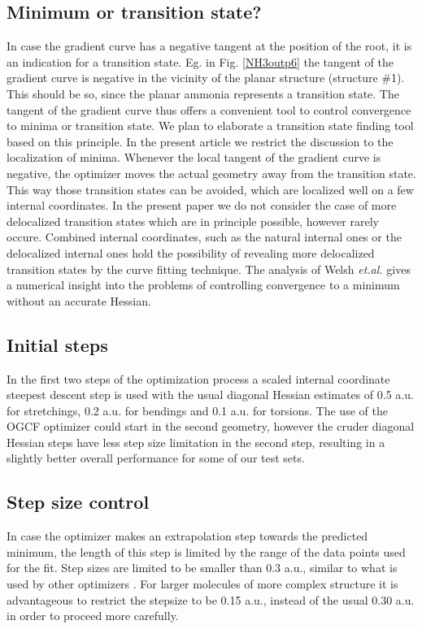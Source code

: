 \documentclass[prl,aps,twocolumn,showpacs,twocolumngrid,superbib]{revtex4}
\begin{document}
\subsection{Minimum or transition state?}
In case the gradient curve has a negative tangent at the position
of the root, it is an indication for a transition state. 
Eg. in Fig. \ref{NH3outp6} the tangent of the gradient curve 
is negative in the vicinity of the planar
structure (structure \#1). This should be so, since the planar
ammonia represents a transition state. The tangent of the gradient 
curve thus offers a
convenient tool to control convergence to minima or transition state.
We plan to elaborate a transition state finding tool based on this 
principle. In the present article we restrict the discussion
to the localization of minima. Whenever the local tangent  
of the gradient curve
is negative, the optimizer moves the actual geometry away from 
the transition state. This way those transition states 
can be avoided, which are localized well on a few internal coordinates. 
In the present paper we do not consider the case of more 
delocalized transition states which are in principle possible,
however rarely occure. Combined internal coordinates, such
as the natural internal ones \cite{Pulay_natural_internals} or the
delocalized internal ones \cite{Baker_deloc_1} hold the possibility
of revealing more delocalized transition states by the
curve fitting technique. The analysis of Welsh {\it et.al.} 
gives a numerical insight into the problems of controlling
convergence to a minimum without an accurate Hessian.

\subsection{Initial steps}
In the first two steps of the optimization
process a scaled internal coordinate steepest descent step is used
with the usual diagonal Hessian estimates of
0.5 a.u. for stretchings, 0.2 a.u. for bendings and 0.1 a.u.
for torsions. The use of the OGCF optimizer could start in the
second geometry, however the cruder diagonal Hessian steps have less
step size limitation in the second step, resulting in a slightly
better overall performance for some of our test sets.

\subsection{Step size control}
In case the optimizer makes an extrapolation step towards the predicted
minimum, the length of this step is limited by the range of the
data points used for the fit. Step sizes are limited to be smaller
than 0.3 a.u., similar to what is used by other optimizers 
\cite{eckert}.
For larger molecules of more complex structure 
it is advantageous to restrict
the stepsize to be 0.15 a.u., instead of the usual 0.30 a.u. 
in order to proceed more carefully.
\end{document}
